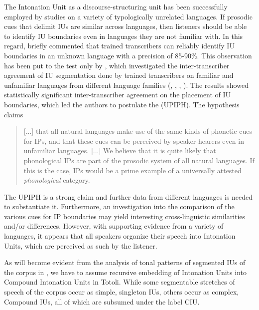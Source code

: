 The Intonation Unit as a discourse-structuring unit has been successfully employed by studies on a variety of typologically unrelated languages. If prosodic cues that delimit IUs are similar across languages,   then listeners should be able to identify IU boundaries even in languages they are not familiar with. In this regard,  \citet[174]{Ford_Thompson_1996} briefly commented that trained transcribers can reliably identify IU boundaries in an unknown language with a precision of 85-90\%. This observation has been put to the test only by  \citet{himmelmann_IP_Universal}, which investigated the inter-transcriber agreement of IU segmentation done by trained transcribers on familiar and unfamiliar languages from different language families (, , , ). The results showed statistically significant inter-transcriber agreement on the placement of IU boundaries,  which led the authors to postulate the  (UPIPH). The hypothesis claims

\begin{quotation}
	[...] that all natural languages make use of the same kinds of phonetic cues for IPs, and that these cues can be perceived by speaker-hearers even in unfamiliar languages. [...] We believe that it is quite likely that phonological IPs are part of the prosodic system of all natural languages. If this is the case, IPs would be a prime example of a universally attested \textit{phonological} category. \citep[239--240]{himmelmann_IP_Universal}
\end{quotation} 

The UPIPH is a strong claim and further data from different languages is needed to substantiate it. Furthermore, an investigation into the comparison of the various cues for IP boundaries may yield interesting cross-linguistic similarities and/or differences. However,  with supporting evidence from a variety of languages, it appears that all speakers organize their speech into Intonation Units, which are perceived as such by the listener. 

As will become evident from the  analysis of tonal patterns of segmented IUs of the corpus in  , we have to assume recursive  embedding of Intonation Units into Compound Intonation Units in Totoli. While some segmentable stretches of speech of the corpus occur as simple, singleton IUs, others occur as  complex, Compound IUs, all of which are subsumed under the label CIU.
